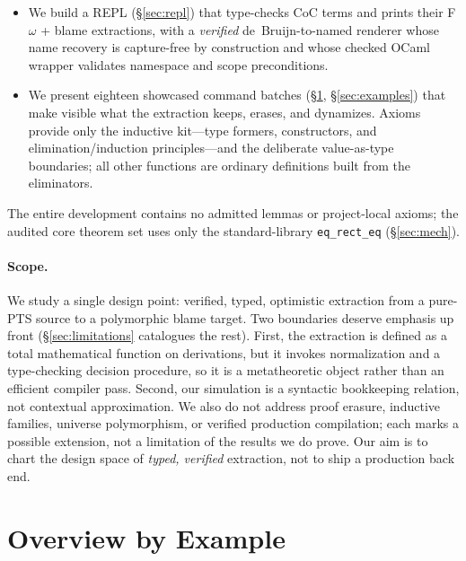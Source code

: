 \documentclass[acmsmall,anonymous=false,nonacm]{acmart}
\begin{document}
\begin{itemize}
\item We build a REPL (\S\ref{sec:repl}) that type-checks CoC terms and prints
their F$\omega$ + blame extractions, with a \emph{verified} de~Bruijn-to-named
renderer whose name recovery is capture-free by construction and whose checked
OCaml wrapper validates namespace and scope preconditions.

\item We present eighteen showcased command batches (\S\ref{sec:overview},
\S\ref{sec:examples}) that make visible what the extraction keeps, erases, and
dynamizes. Axioms provide only the inductive kit---type formers, constructors,
and elimination/induction principles---and the deliberate value-as-type
boundaries; all other functions are ordinary definitions built from the
eliminators.
\end{itemize}

The entire development contains no admitted lemmas or project-local axioms;
the audited core theorem set uses only the standard-library
\texttt{eq\_rect\_eq} (\S\ref{sec:mech}).

\paragraph{Scope.}
We study a single design point: verified, typed, optimistic extraction from a
pure-PTS source to a polymorphic blame target. Two boundaries deserve emphasis
up front (\S\ref{sec:limitations} catalogues the rest). First, the extraction
is defined as a total mathematical function on derivations, but it invokes
normalization and a type-checking decision procedure, so it is a metatheoretic
object rather than an efficient compiler pass. Second, our simulation is a
syntactic bookkeeping relation, not contextual approximation. We also do not
address proof erasure, inductive families, universe polymorphism, or verified
production compilation; each marks a possible extension, not a limitation of
the results we do prove. Our aim is to chart the design space of \emph{typed,
verified} extraction, not to ship a production back end.

\section{Overview by Example}\label{sec:overview}
\end{document}
